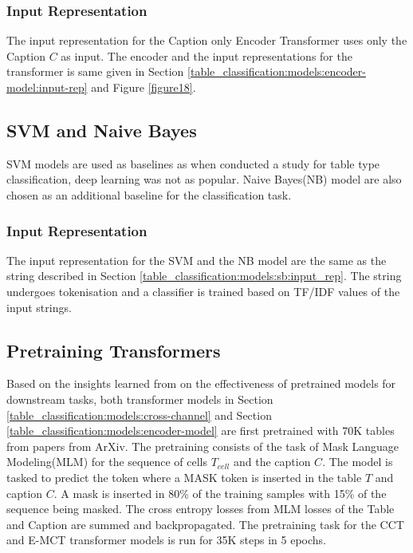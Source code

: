 \subsubsection{Input Representation}
The input representation for the Caption only Encoder Transformer uses only the Caption $C$ as input. The encoder and the input representations for the transformer is same given in Section \ref{table_classification:models:encoder-model:input-rep} and Figure \ref{figure18}.

\subsection{SVM and Naive Bayes}
SVM models are used as baselines as when \cite{kim2012scientific} conducted a study for table type classification, deep learning was not as popular. Naive Bayes(NB) model are also chosen as an additional baseline for the classification task. 

\subsubsection{Input Representation}
The input representation for the SVM and the NB model are the same as the string described in Section \ref{table_classification:models:sb:input_rep}. The string undergoes tokenisation and a classifier is trained based on TF/IDF values of the input strings. 

\subsection{Pretraining Transformers}
\label{table_classification:pre-train}
Based on the insights learned from \cite{hernandez2021scaling} on the effectiveness of pretrained models for downstream tasks, both transformer models in Section \ref{table_classification:models:cross-channel} and Section \ref{table_classification:models:encoder-model} are first pretrained with 70K tables from papers from ArXiv. The pretraining consists of the task of Mask Language Modeling(MLM) for the sequence of cells $T_{cell}$ and the caption $C$. The model is tasked to predict the token where a MASK token is inserted in the table $T$ and caption $C$. A mask is inserted in 80\% of the training samples with 15\% of the sequence being masked. The cross entropy losses from MLM losses of the Table and Caption are summed and backpropagated. The pretraining task for the CCT and E-MCT transformer models is run for 35K steps in 5 epochs.

